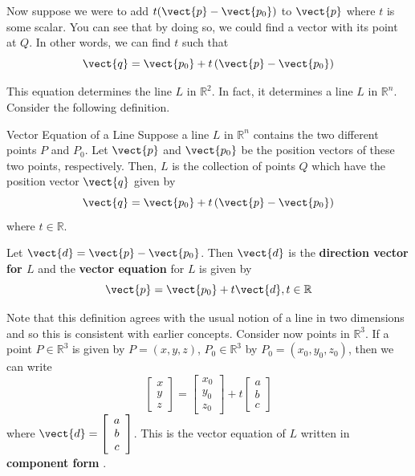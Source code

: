Now suppose we were to add $t(\vect{p} - \vect{p_0})$ to $\vect{p}$ where $t$ is some scalar.
You can see that by doing so, we could find a vector with its point at $Q$. In other words, we can find $t$ such that 
\begin{equation*}
\vect{q} = \vect{p_0} + t \left( \vect{p}- \vect{p_0}\right)
\end{equation*}

This equation determines the line $L$ in $\mathbb{R}^2$. In fact, it determines a line $L$ in $\mathbb{R}^n$. Consider the following definition.

\begin{definition}{Vector Equation of a Line}\label{def:vectorequationofline}
Suppose a line $L$ in $\mathbb{R}^{n}$ contains the two
different points $P$ and 
$P_0$. Let $\vect{p}$ and $\vect{p_0}$ be the position vectors of these two points, respectively.
Then, $L$ is the collection of points $Q$ which have the position vector $\vect{q}$ given by
\begin{equation*}
\vect{q}=\vect{p_0}+t\left( \vect{p}-\vect{p_0}\right)
\end{equation*}
where $t\in \mathbb{R}$. 

Let $\vect{d} = \vect{p} - \vect{p_0}$. Then $\vect{d}$ is the \textbf{direction vector for $L$}  and the \textbf{vector equation} for $L$ is given by 
\begin{equation*}
\vect{p}=\vect{p_0}+t\vect{d}, t\in\mathbb{R}
\end{equation*}
\end{definition}

Note that this definition agrees with the usual notion of a
line in two dimensions and so this is consistent with earlier concepts. Consider now points in $\mathbb{R}^3$. If a point $P \in \mathbb{R}^3$ is given by $P = \left( x,y,z \right)$, $P_0 \in \mathbb{R}^3$ by $P_0 = \left( x_0, y_0, z_0 \right)$, then we can write
\begin{equation*}
\left[
\begin{array}{c}
x \\
y \\
z 
\end{array}
\right] = 
\left[
\begin{array}{c}
x_0 \\
y_0 \\
z_0 
\end{array}
\right]
+
t
\left[
\begin{array}{c}
a \\
b \\
c 
\end{array}
\right]
\end{equation*}
where $\vect{d} = \left[
\begin{array}{c}
a \\
b \\
c 
\end{array}
\right]$. This is the vector equation of $L$ written in \textbf{component form} .

